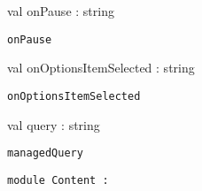 \documentclass[11pt]{article}
\begin{document}
\begin{ocamldocsigend}
\begin{ocamldocdescription}
\end{ocamldocdescription}


\label{val:Android.App.onPause}\begin{ocamldoccode}
val onPause : string
\end{ocamldoccode}
\begin{ocamldocdescription}
{\tt{onPause}}


\end{ocamldocdescription}


\label{val:Android.App.onOptionsItemSelected}\begin{ocamldoccode}
val onOptionsItemSelected : string
\end{ocamldoccode}
\begin{ocamldocdescription}
{\tt{onOptionsItemSelected}}


\end{ocamldocdescription}


\label{val:Android.App.query}\begin{ocamldoccode}
val query : string
\end{ocamldoccode}
\begin{ocamldocdescription}
{\tt{managedQuery}}


\end{ocamldocdescription}
\end{ocamldocsigend}






\begin{ocamldoccode}
{\tt{module }}{\tt{Content}}{\tt{ : }}\end{ocamldoccode}
\label{module:Android.Content}
\end{document}
